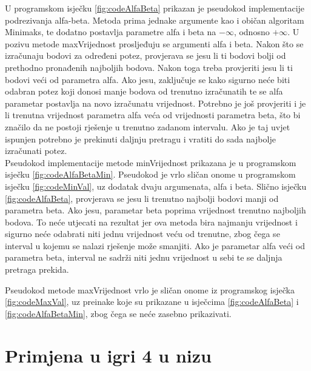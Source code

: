\documentclass[times, utf8, seminar, numeric, tikz]{fer}
\begin{document}
U programskom isječku \ref{fig:codeAlfaBeta} prikazan je pseudokod implementacije podrezivanja alfa-beta. Metoda prima jednake argumente kao i običan algoritam Minimaks, te dodatno postavlja parametre alfa i beta na $-\infty$, odnosno $+\infty$. U pozivu metode \ttfamily maxVrijednost \rmfamily prosljeđuju se argumenti alfa i beta. Nakon što se izračunaju bodovi za određeni potez, provjerava se jesu li ti bodovi bolji od prethodno pronađenih najboljih bodova. Nakon toga treba provjeriti jesu li ti bodovi veći od parametra alfa. Ako jesu, zaključuje se kako sigurno neće biti odabran potez koji donosi manje bodova od trenutno izračunatih te se alfa parametar postavlja na novo izračunatu vrijednost. Potrebno je još provjeriti i je li trenutna vrijednost parametra alfa veća od vrijednosti parametra beta, što bi značilo da ne postoji rješenje u trenutno zadanom intervalu. Ako je taj uvjet ispunjen potrebno je prekinuti daljnju pretragu i vratiti do sada najbolje izračunati potez.\\

Pseudokod implementacije metode \ttfamily minVrijednost \rmfamily prikazana je u programskom isječku \ref{fig:codeAlfaBetaMin}. Pseudokod je vrlo sličan onome u programskom isječku \ref{fig:codeMinVal}, uz dodatak dvaju argumenata, alfa i beta. Slično isječku \ref{fig:codeAlfaBeta}, provjerava se jesu li trenutno najbolji bodovi manji od parametra beta. Ako jesu, parametar beta poprima vrijednost trenutno najboljih bodova. To neće utjecati na rezultat jer ova metoda bira najmanju vrijednost i sigurno neće odabrati niti jednu vrijednost veću od trenutne, zbog čega se interval u kojemu se nalazi rješenje može smanjiti. Ako je parametar alfa veći od parametra beta, interval ne sadrži niti jednu vrijednost u sebi te se daljnja pretraga prekida.

\begin{minipage}{\textwidth}
	
\end{minipage}


Pseudokod metode \ttfamily maxVrijednost \rmfamily vrlo je sličan onome iz programskog isječka \ref{fig:codeMaxVal}, uz preinake koje su prikazane u isječcima \ref{fig:codeAlfaBeta} i \ref{fig:codeAlfaBetaMin}, zbog čega se neće zasebno prikazivati.

\chapter{Primjena u igri 4 u nizu}
\end{document}
